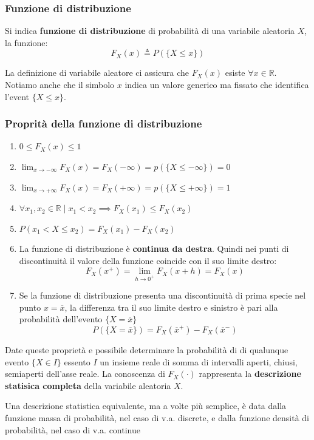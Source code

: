 \documentclass[11pt,a4paper]{article}
\begin{document}
\subsubsection{Funzione di distribuzione}\label{sec:Funzione di distribuzione} %
\begin{importantbox}
   Si indica \textbf{funzione di distribuzione} di probabilità di una variabile 
   aleatoria $X$, la funzione: 
   \[
       F_X(x) \triangleq P(\{X \leq  x\})
   \]
\end{importantbox}
La definizione di variabile aleatore ci assicura che $F_X(x)$ esiste $\forall x \in \mathbb R$. 
Notiamo anche che il simbolo $x$ indica un valore generico ma fissato che identifica
l'event $\{X \leq x\}$.
\subsubsection{Proprità della funzione di distribuzione}\label{sec:Proprità della funzione di distribuzione} %
\begin{enumerate}
    \item $ 0 \leq F_X(x) \leq 1$
    \item $\lim_{x \to -\infty} F_X(x) = F_X(-\infty) = p(\{X \leq -\infty\}) = 0 $
    \item $\lim_{x \to +\infty} F_X(x) = F_X(+\infty) = p(\{X \leq +\infty\}) = 1 $
    \item $\forall x_1,x_2 \in \mathbb R \mid x_1 < x_2 \implies F_X(x_1) \leq F_X(x_2)$ 
    \item $P(x_1 < X \leq x_2) = F_X(x_1) - F_X(x_2)$ 
    \item La funzione di distribuzione è \textbf{continua da destra}. Quindi nei punti di
    discontinuità il valore della funzione coincide con il suo limite destro: 
    \[
        F_X(x^+) = \lim_{h \to 0^+}F_X(x + h) = F_X(x)
    \]
    \item Se la funzione di distribuzione presenta una discontinuità di prima
    specie nel punto $x = \overline x$, la differenza tra il suo limite destro e sinistro
    è pari alla probabilità dell’evento $\{X = \overline x\}$
    \[
        P(\{X = \overline x\}) = F_X(\overline x^+) - F_X(\overline x^-)
    \]
\end{enumerate}
Date queste proprietà e possibile determinare la probabilità di di qualunque evento
$\{X \in I\}$ essento $I$ un insieme reale di somma di intervalli aperti, chiusi, semiaperti
dell'asse reale. La conoscenza di $F_X(\cdot)$ rappresenta la \textbf{descrizione statisica completa}
della variabile aleatoria $X$.
\begin{importantbox}
   Una descrizione statistica equivalente, ma a volte più semplice, è
    data dalla funzione massa di probabilità, nel caso di v.a. discrete, e
    dalla funzione densità di probabilità, nel caso di v.a. continue 
\end{importantbox}
\end{document}
